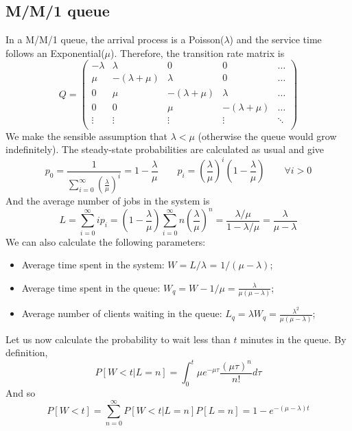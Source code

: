 \documentclass[12pt, openany]{report}
\theoremstyle{definition}
\begin{document}
\subsection{M/M/1 queue}
In a M/M/1 queue, the arrival process is a Poisson($\lambda$) and the service time follows an Exponential($\mu$). Therefore, the transition rate matrix is 
\begin{equation}
	Q = \begin{pmatrix}
		-\lambda & \lambda & 0 & 0 & \dots \\
		\mu & -(\lambda+\mu) & \lambda & 0 & \dots \\
		0 & \mu & -(\lambda+\mu) & \lambda & \dots \\
		0 & 0 & \mu & -(\lambda+\mu) & \dots \\
		\vdots & \vdots & \vdots & \vdots & \ddots\\
	\end{pmatrix}
\end{equation}
We make the sensible assumption that $\lambda<\mu$ (otherwise the queue would grow indefinitely). The steady-state probabilities are calculated as usual and give
\begin{equation}
	p_0 = \frac{1}{\sum_{i=0}^\infty \left(\frac{\lambda}{\mu}\right)^i} = 1-\frac{\lambda}{\mu} \qquad p_i = \left(\frac{\lambda}{\mu}\right)^i\left(1-\frac{\lambda}{\mu}\right) \qquad \forall i> 0
\end{equation}
And the average number of jobs in the system is 
\begin{equation}
	L = \sum_{i=0}^\infty i p_i = \left(1-\frac{\lambda}{\mu}\right)\sum_{i=0}^\infty n\left(\frac{\lambda}{\mu}\right)^n = \frac{\lambda/\mu}{1-\lambda/\mu} = \frac{\lambda}{\mu-\lambda}
\end{equation}
We can also calculate the following parameters:
\begin{itemize}
	\item Average time spent in the system: $W=L/\lambda$ = $1/(\mu-\lambda)$;
	\item Average time spent in the queue: $W_q = W - 1/\mu = \frac{\lambda}{\mu(\mu-\lambda)}$;
	\item Average number of clients waiting in the queue: $L_q = \lambda W_q = \frac{\lambda^2}{\mu(\mu-\lambda)}$;
\end{itemize}
Let us now calculate the probability to wait less than $t$ minutes in the queue. By definition,
\begin{equation}
	P[W<t|L=n] = \int_0^t \mu e^{-\mu \tau}\frac{(\mu\tau)^n}{n!}d\tau
\end{equation}
And so 
\begin{equation}
	P[W<t] = \sum_{n=0}^\infty P[W<t|L=n]P[L=n] = 1-e^{-(\mu-\lambda)t}
\end{equation}
\end{document}
